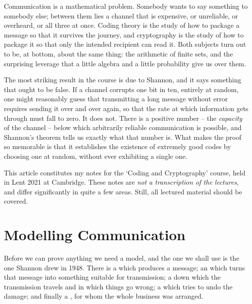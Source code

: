 



Communication is a mathematical problem. Somebody wants to say something to somebody else; between them lies a channel that is expensive, or unreliable, or overheard, or all three at once. Coding theory is the study of how to package a message so that it survives the journey, and cryptography is the study of how to package it so that only the intended recipient can read it. Both subjects turn out to be, at bottom, about the same thing: the arithmetic of finite sets, and the surprising leverage that a little algebra and a little probability give us over them.

The most striking result in the course is due to Shannon, and it says something that ought to be false. If a channel corrupts one bit in ten, entirely at random, one might reasonably guess that transmitting a long message without error requires sending it over and over again, so that the rate at which information gets through must fall to zero. It does not. There is a positive number -- the \emph{capacity} of the channel -- below which arbitrarily reliable communication is possible, and Shannon's theorem tells us exactly what that number is. What makes the proof so memorable is that it establishes the existence of extremely good codes by choosing one at random, without ever exhibiting a single one.

This article constitutes my notes for the `Coding and Cryptography' course, held in Lent 2021 at Cambridge. These notes are \emph{not a transcription of the lectures}, and differ significantly in quite a few areas. Still, all lectured material should be covered.



\section{Modelling Communication}

Before we can prove anything we need a model, and the one we shall use is the one Shannon drew in 1948. There is a  which produces a message; an  which turns that message into something suitable for transmission; a  down which the transmission travels and in which things go wrong; a  which tries to undo the damage; and finally a , for whom the whole business was arranged.

